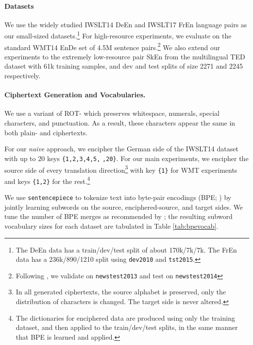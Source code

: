 \documentclass[11pt]{article}
\begin{document}
\paragraph{Datasets} 
We use the widely studied IWSLT14 DeEn and IWSLT17 FrEn language pairs as our small-sized datasets.\footnote{The DeEn data has a train/dev/test split of about 170k/7k/7k. The FrEn data has a 236k/890/1210 split using \texttt{dev2010} and \texttt{tst2015}.}
For high-resource experiments, we evaluate on the standard WMT14 EnDe set of 4.5M sentence pairs.\footnote{Following \citet{vaswani2017attention}, we validate on \texttt{newstest2013} and test on \texttt{newstest2014}} 
We also extend our experiments to the extremely low-resource pair SkEn from the multilingual TED dataset \cite{qi-etal-2018-pre} with 61k training samples, and dev and test splits of size 2271 and 2245 respectively.

\paragraph{Ciphertext Generation and Vocabularies.} \label{sec:vocabs}
We use a variant of ROT- which preserves whitespace, numerals, special characters, and punctuation. 
As a result, these characters appear the same in both plain- and ciphertexts.

For our \emph{naive} approach, we encipher the German side of the IWSLT14 dataset with up to 20 keys \texttt{\{1,2,3,4,5,}  \texttt{,20\}}. For our main experiments, we encipher the source side of every translation direction\footnote{In all generated ciphertexts, the source alphabet is preserved, only the distribution of characters is changed. The target side is never altered.} with key \texttt{\{1\}} for WMT experiments and keys \texttt{\{1,2\}} for the rest.\footnote{The dictionaries for enciphered data are produced using only the training dataset, and then applied to the train/dev/test splits, in the same manner that BPE is learned and applied.}

We use \texttt{sentencepiece} \cite{kudo-richardson-2018-sentencepiece} to tokenize text into byte-pair encodings (BPE; \citealt{sennrich-etal-2016-neural}) by jointly learning subwords on the source, enciphered-source, and target sides.  
We tune the number of BPE merges as recommended by \citet{ding-etal-2019-call}; the resulting subword vocabulary sizes for each dataset are tabulated in Table \ref{tab:bpevocab}.
\end{document}
